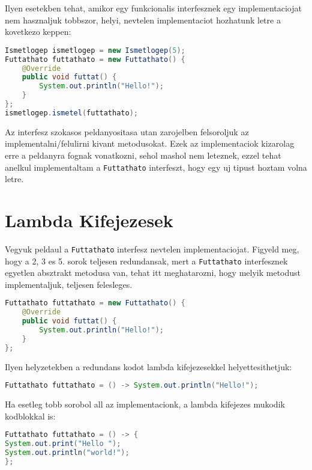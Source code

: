 \documentclass{article}
\let\l\lstinline
\begin{document}
Ilyen esetekben tehat, amikor egy funkcionalis interfesznek egy implementaciojat nem hasznaljuk tobbszor, helyi, nevtelen implementaciot hozhatunk letre a kovetkezo keppen:

\begin{lstlisting}[language=Java, caption=Futtathato interfesz nevtelen implementacioja]
Ismetlogep ismetlogep = new Ismetlogep(5);
Futtathato futtathato = new Futtathato() {
    @Override
    public void futtat() {
        System.out.println("Hello!");
    }
};
ismetlogep.ismetel(futtathato);
\end{lstlisting}

Az interfesz szokasos peldanyositasa utan zarojelben felsoroljuk az implementalni/felulirni kivant metodusokat. Ezek az implementaciok kizarolag erre a peldanyra fognak vonatkozni, sehol mashol nem leteznek, ezzel tehat anelkul implementaltam a \l{Futtathato} interfeszt, hogy egy uj tipust hoztam volna letre.

\newpage

\section{Lambda Kifejezesek}

Vegyuk peldaul a \l{Futtathato} interfesz nevtelen implementaciojat. Figyeld meg, hogy a 2, 3 es 5. sorok teljesen redundansak, mert a \l{Futtathato} interfesznek egyetlen absztrakt metodusa van, tehat itt meghatarozni, hogy melyik metodust implementaljuk, teljesen felesleges.

\begin{lstlisting}[language=Java, caption=Futtathato interfesz nevtelen implementacioja]
Futtathato futtathato = new Futtathato() {
    @Override
    public void futtat() {
        System.out.println("Hello!");
    }
};
\end{lstlisting}

Ilyen helyzetekben a redundans kodot lambda kifejezesekkel helyettesithetjuk:

\begin{lstlisting}[language=Java, caption=Egysoros lambda kifejezes]
Futtathato futtathato = () -> System.out.println("Hello!");
\end{lstlisting}

Ha esetleg tobb sorobol all az implementacionk, a lambda kifejezes mukodik kodblokkal is:

\begin{lstlisting}[language=Java, caption=Lambda kifejezes kodblokkal]
Futtathato futtathato = () -> {
System.out.print("Hello ");
System.out.println("world!");
};
\end{lstlisting}
\end{document}
